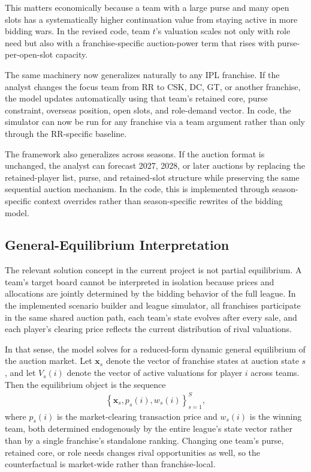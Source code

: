 \documentclass[11pt]{article}
\begin{document}


This matters economically because a team with a large purse and many open slots has a systematically higher continuation value from staying active in more bidding wars. In the revised code, team \(t\)'s valuation scales not only with role need but also with a franchise-specific auction-power term that rises with purse-per-open-slot capacity.

The same machinery now generalizes naturally to any IPL franchise. If the analyst changes the focus team from RR to CSK, DC, GT, or another franchise, the model updates automatically using that team's retained core, purse constraint, overseas position, open slots, and role-demand vector. In code, the simulator can now be run for any franchise via a team argument rather than only through the RR-specific baseline.

The framework also generalizes across seasons. If the auction format is unchanged, the analyst can forecast 2027, 2028, or later auctions by replacing the retained-player list, purse, and retained-slot structure while preserving the same sequential auction mechanism. In the code, this is implemented through season-specific context overrides rather than season-specific rewrites of the bidding model.

\subsection{General-Equilibrium Interpretation}

The relevant solution concept in the current project is not partial equilibrium. A team's target board cannot be interpreted in isolation because prices and allocations are jointly determined by the bidding behavior of the full league. In the implemented scenario builder and league simulator, all franchises participate in the same shared auction path, each team's state evolves after every sale, and each player's clearing price reflects the current distribution of rival valuations.

In that sense, the model solves for a reduced-form dynamic general equilibrium of the auction market. Let \(\mathbf{x}_s\) denote the vector of franchise states at auction state \(s\), and let \(V_s(i)\) denote the vector of active valuations for player \(i\) across teams. Then the equilibrium object is the sequence
\begin{align}
\left\{\mathbf{x}_s, p_s(i), w_s(i)\right\}_{s=1}^{S},
\end{align}
where \(p_s(i)\) is the market-clearing transaction price and \(w_s(i)\) is the winning team, both determined endogenously by the entire league's state vector rather than by a single franchise's standalone ranking. Changing one team's purse, retained core, or role needs changes rival opportunities as well, so the counterfactual is market-wide rather than franchise-local.
\end{document}
